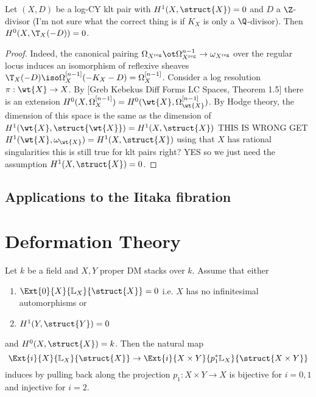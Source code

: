 \documentclass[12pt]{article}
\newcommand{\LL}{\mathbb{L}}
\begin{document}
\begin{lemma}
Let $(X, D)$ be a log-CY klt pair with $H^1(X, \struct{X}) = 0$ and $D$ a $\Z$-divisor (I'm not sure what the correct thing is if $K_X$ is only a $\Q$-divisor). Then $H^0(X, \T_X(-D)) = 0$.
\end{lemma}

\newcommand{\reg}{\mathrm{reg}}

\begin{proof}
Indeed, the canonical pairing $\Omega_{X^{\reg}} \ot \Omega_{X^{\reg}}^{n-1} \to \omega_{X^{\reg}}$ over the regular locus induces an isomorphism of reflexive sheaves $\T_X(-D) \iso \Omega_X^{[n-1]}(-K_X - D) = \Omega_X^{[n-1]}$. Consider a log resolution $\pi : \wt{X} \to X$. By [Greb Kebekus Diff Forms LC Spaces, Theorem 1.5] there is an extension $H^0(X, \Omega_X^{[n-1]}) = H^0(\wt{X}, \Omega_{\wt{X}}^{[n-1]})$. By Hodge theory, the dimension of this space is the same as the dimension of $H^1(\wt{X}, \struct{\wt{X}}) = H^1(X, \struct{X})$ {\color{red} THIS IS WRONG GET $H^1(\wt{X}, \omega_{\wt{X}}) = H^1(X, \struct{X})$} using that $X$ has rational singularities {\color{red} this is still true for klt pairs right? YES} so we just need the assumption $H^1(X, \struct{X}) = 0$.
\end{proof}

\subsection{Applications to the Iitaka fibration}

\section{Deformation Theory}

\begin{lemma}
Let $k$ be a field and $X,Y$ proper DM stacks over $k$. Assume that either
\begin{enumerate}
\item $\Ext{0}{X}{\LL_X}{\struct{X}} = 0$ i.e. $X$ has no infinitesimal automorphisms or
\item $H^1(Y, \struct{Y}) = 0$ 
\end{enumerate}
and $H^0(X, \struct{X}) = k$. Then the natural map
\[ \Ext{i}{X}{\LL_X}{\struct{X}} \to \Ext{i}{X \times Y}{p_1^* \LL_X}{\struct{X \times Y}} \]
induces by pulling back along the projection $p_1 : X \times Y \to X$ is bijective for $i = 0,1$ and injective for $i = 2$.
\end{lemma}
\end{document}
